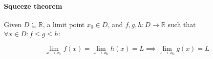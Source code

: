 \documentclass[12pt,a4paper]{report}
\numberwithin{equation}{section}
\theoremstyle{definition}
\theoremstyle{remark}
\begin{document}
\paragraph{Squeeze theorem}

Given $D \subseteq \mathbb{R}$, a limit point $x_0 \in D$, and $f, g, h: D \rightarrow \mathbb{R}$ such that $\forall x \in D: f \leq g \leq h$:

\begin{equation}
\lim_{x\rightarrow x_0} f(x) = \lim_{x \rightarrow x_0} h(x) = L \implies \lim_{x \rightarrow x_0} g(x) = L
\end{equation}
 
\tableofcontents
\end{document}
